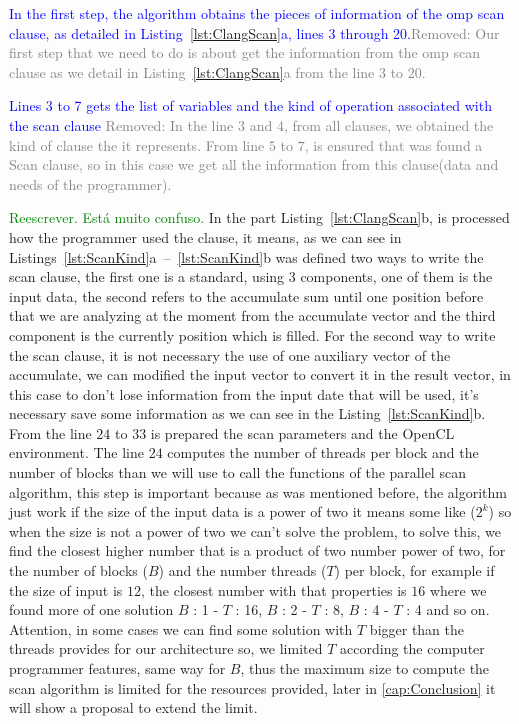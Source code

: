 \documentclass[Ingles]{ic-tese-v1}
\newcommand{\marcio}[1]{\textcolor{green}{ {#1}}}
\newcommand{\rem}[1]{\noindent\textcolor{gray}{Removed: {#1}}}
\newcommand{\new}[1]{\noindent\textcolor{blue}{ {#1}}}
\newcommand{\marcio}[1]{}
\newcommand{\rem}[1]{}
\newcommand{\new}[1]{#1}
\newcommand{\rlst}[1]{Listing~\ref{lst:#1}}
\newcommand{\rlstn}[3]{Listings~\ref{lst:#1}{#2}~--~\ref{lst:#1}{#3}}
\begin{document}
\new{In the first step, the algorithm obtains the pieces of information of the
omp scan clause, as detailed in \rlst{ClangScan}{a}, lines 3 through
20.}\rem{Our first step that we need to do is about get the information from
the omp scan clause as we detail in \rlst{ClangScan}{a} from the line $3$ to
$20$.\\}

\new{Lines 3 to 7 gets the list of variables and the kind of operation
  associated with the scan clause} \rem{In the line $3$ and $4$, from all
  clauses, we obtained the kind of clause the it represents.  From line $5$ to
  $7$, is ensured that was found a Scan clause, so in this case we get all the
information from this clause(data and needs of the programmer).\\}

\marcio{Reescrever. Está muito confuso.}
In the part \rlst{ClangScan}{b}, is processed how the programmer used the clause,
it means, as we can see in \rlstn{ScanKind}{a}{b} was defined two ways to write the scan clause, the first one is a standard, using 3 components, one of them is the input data, the second refers to the accumulate sum until one position before that we are analyzing at the moment from the accumulate vector and the third component is the currently position which is filled. For the second way to write the scan clause, it is not necessary the use of one auxiliary vector of the accumulate, we can modified the input vector to convert it in the result vector, in this case to don't lose information from
the input date that will be used, it's necessary save some information as we can see
in the \rlst{ScanKind}{b}.\\
From the line $24$ to $33$ is prepared the scan parameters and the OpenCL environment.
The line $24$ computes the number of threads per block and the number of blocks than we will use to call the functions of the parallel scan algorithm, this step is important because as was mentioned before, the algorithm just work if the size of the input data is a power of two it means some like ($2^{k}$) so when the size is not a power of two we can't solve the problem, to solve this, we find the closest higher number that is a product of two number power of two, for the number of blocks ($B$) and the number threads ($T$) per block, for example if the size of input is $12$, the closest number with that properties is $16$ where we found more of one solution $B$ : 1 - $T$ : 16, $B$ : 2 - $T$ : 8, $B$ : 4 - $T$ : 4 and so on. Attention, in some cases we can find some solution with $T$ bigger than the threads provides for our architecture so, we limited $T$ according the computer programmer features, same way for $B$, thus the maximum size to compute the scan algorithm is limited for the resources provided, later in \ref{cap:Conclusion} it will show a proposal to extend the limit.\\
\end{document}

